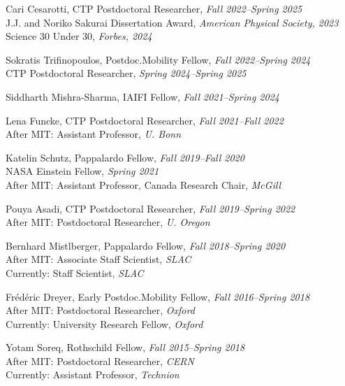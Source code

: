 \bbl

\item Cari Cesarotti, CTP Postdoctoral Researcher, \emph{Fall 2022--Spring 2025}
\\ J.J. and Noriko Sakurai Dissertation Award, \emph{American Physical Society, 2023}
\\ Science 30 Under 30, \emph{Forbes, 2024}

\item Sokratis Trifinopoulos, Postdoc.Mobility Fellow, \emph{Fall 2022--Spring 2024}
\\ CTP Postdoctoral Researcher, \emph{Spring 2024--Spring 2025}

\item Siddharth Mishra-Sharma, IAIFI Fellow, \emph{Fall 2021--Spring 2024}

\item Lena Funcke, CTP Postdoctoral Researcher, \emph{Fall 2021--Fall 2022}
\\ After MIT: Assistant Professor, \emph{U. Bonn}

\item Katelin Schutz, Pappalardo Fellow, \emph{Fall 2019--Fall 2020}
\\ NASA Einstein Fellow, \emph{Spring 2021}
\\ After MIT: Assistant Professor, Canada Research Chair, \emph{McGill}

\item Pouya Asadi, CTP Postdoctoral Researcher, \emph{Fall 2019--Spring 2022}
\\ After MIT: Postdoctoral Researcher, \emph{U. Oregon}

\item Bernhard Mistlberger, Pappalardo Fellow, \emph{Fall 2018--Spring 2020}
\\ After MIT: Associate Staff Scientist, \emph{SLAC}
\\ Currently: Staff Scientist, \emph{SLAC}

\item Frédéric Dreyer, Early Postdoc.Mobility Fellow, \emph{Fall 2016--Spring 2018}
\\ After MIT: Postdoctoral Researcher, \emph{Oxford}
\\ Currently: University Research Fellow, \emph{Oxford}

\item Yotam Soreq, Rothschild Fellow, \emph{Fall 2015--Spring 2018}
\\ After MIT: Postdoctoral Researcher, \emph{CERN}
\\ Currently: Assistant Professor, \emph{Technion}

